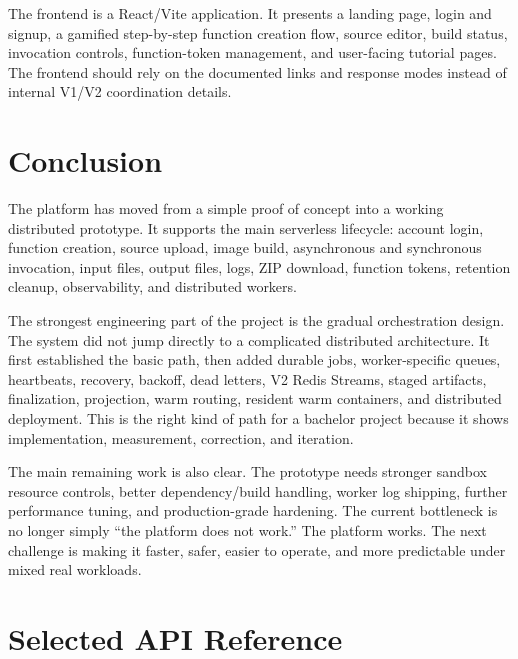 \documentclass[12pt,a4paper]{report}
\begin{document}
The frontend is a React/Vite application. It presents a landing page, login and
signup, a gamified step-by-step function creation flow, source editor, build
status, invocation controls, function-token management, and user-facing
tutorial pages. The frontend should rely on the documented links and response
modes instead of internal V1/V2 coordination details.

\clearpage

\chapter{Conclusion}

The platform has moved from a simple proof of concept into a working
distributed prototype. It supports the main serverless lifecycle: account
login, function creation, source upload, image build, asynchronous and
synchronous invocation, input files, output files, logs, ZIP download, function
tokens, retention cleanup, observability, and distributed workers.

The strongest engineering part of the project is the gradual orchestration
design. The system did not jump directly to a complicated distributed
architecture. It first established the basic path, then added durable jobs,
worker-specific queues, heartbeats, recovery, backoff, dead letters, V2 Redis
Streams, staged artifacts, finalization, projection, warm routing, resident
warm containers, and distributed deployment. This is the right kind of path for
a bachelor project because it shows implementation, measurement, correction,
and iteration.

The main remaining work is also clear. The prototype needs stronger sandbox
resource controls, better dependency/build handling, worker log shipping,
further performance tuning, and production-grade hardening. The current
bottleneck is no longer simply ``the platform does not work.'' The platform
works. The next challenge is making it faster, safer, easier to operate, and
more predictable under mixed real workloads.

\appendix

\chapter{Selected API Reference}
\end{document}
